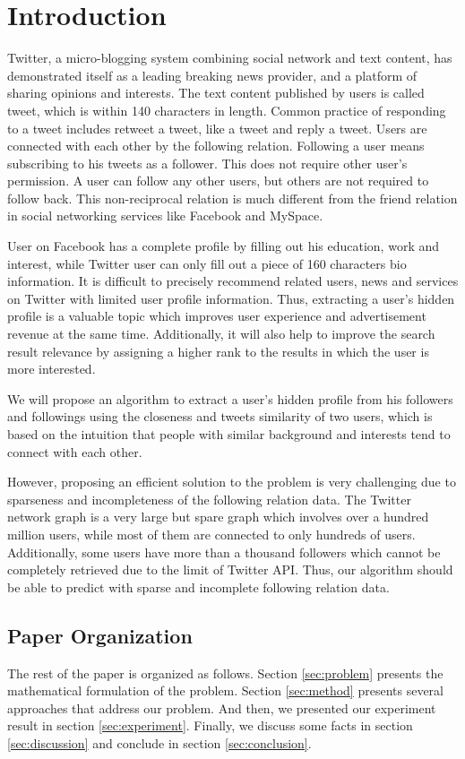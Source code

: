 \section{Introduction}

Twitter, a micro-blogging system combining social network and text content, has demonstrated itself as a leading breaking news provider, and a platform of sharing opinions and interests. The text content published by users is called tweet, which is within 140 characters in length. Common practice of responding to a tweet includes retweet a tweet, like a tweet and reply a tweet. Users are connected with each other by the following relation. Following a user means subscribing to his tweets as a follower. This does not require other user's permission. A user can follow any other users, but others are not required to follow back. This non-reciprocal relation is much different from the friend relation in social networking services like Facebook and MySpace.

User on Facebook has a complete profile by filling out his education, work and interest, while Twitter user can only fill out a piece of 160 characters bio information. It is difficult to precisely recommend related users, news and services on Twitter with limited user profile information. Thus, extracting a user's hidden profile is a valuable topic which improves user experience and advertisement revenue at the same time. Additionally, it will also help to improve the search result relevance by assigning a higher rank to the results in which the user is more interested.

We will propose an algorithm to extract a user's hidden profile from his followers and followings using the closeness and tweets similarity of two users, which is based on the intuition that people with similar background and interests tend to connect with each other.

However, proposing an efficient solution to the problem is very challenging due to sparseness and incompleteness of the following relation data. The Twitter network graph is a very large but spare graph which involves over a hundred million users, while most of them are connected to only hundreds of users. Additionally, some users have more than a thousand followers which cannot be completely retrieved due to the limit of Twitter API. Thus, our algorithm should be able to predict with sparse and incomplete following relation data.

\subsection{Paper Organization}

The rest of the paper is organized as follows.
Section \ref{sec:problem} presents the mathematical formulation of the
problem. Section \ref{sec:method} presents several approaches that address our problem. And then, we presented our experiment result in section \ref{sec:experiment}. Finally, we discuss some facts in section \ref{sec:discussion} and conclude in section \ref{sec:conclusion}.
